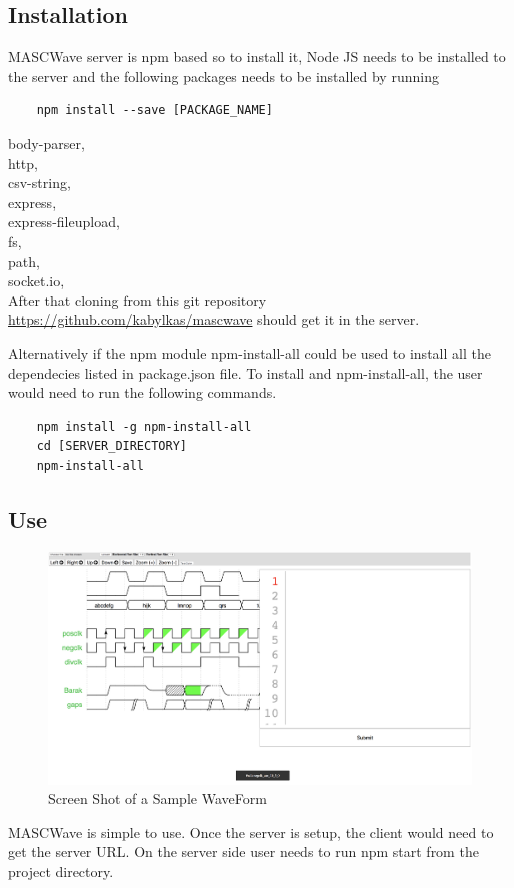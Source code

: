 \documentclass[14pt]{extarticle}
\begin{document}
\subsection{Installation}
 	MASCWave server is npm based so to install it, Node JS needs to be installed to the server and the following packages needs to be installed by running 
 
 \begin{verbatim}
 	npm install --save [PACKAGE_NAME]
\end{verbatim}	
    \textendash body-parser,\\
    \textendash http,\\
    \textendash csv-string,\\
    \textendash express,\\
    \textendash express-fileupload,\\
    \textendash fs,\\
    \textendash path,\\
    \textendash socket.io,\\
 After that cloning from this git repository \url{https://github.com/kabylkas/mascwave} should get it in the server.
 
 \par Alternatively if the npm module npm-install-all could be used to install all the dependecies listed in package.json file. To install and npm-install-all, the user would need to run the following commands.
 
    \begin{verbatim}
    npm install -g npm-install-all
    cd [SERVER_DIRECTORY]
    npm-install-all
    \end{verbatim}
    
\subsection{Use}
\begin{figure}[H]
    \centering
    \includegraphics[scale=0.3]{tutorial}
    \caption{Screen Shot of a Sample WaveForm}
    \label{fig:my_label}
\end{figure}
 MASCWave is simple to use. Once the server is setup, the client would need to get the server URL. On the server side user needs to run npm start from the project directory.
\end{document}
